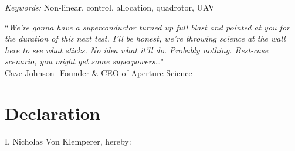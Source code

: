 \documentclass[a4paper, 11pt, oneside, openright, parskip=full]{book}
\newcommand{\auth}{Nicholas Von Klemperer}								%
\newcommand{\key}{Non-linear, control, allocation, quadrotor, UAV}					   %
\begin{document}
\begin{titlepage}
		\vskip 15mm	
	\begin{normalsize}				
		{\itshape Keywords:}
		\key			
	\end{normalsize}	
\end{titlepage}
\afterpage{\null\newpage}
\frontmatter
\begin{center}
\begin{minipage}{0.7\textwidth}
\centering
``\emph{We're gonna have a superconductor turned up full blast and pointed at you for the duration of this next test. I'll be honest, we're throwing science at the wall here to see what sticks. No idea what it'll do. Probably nothing. Best-case scenario, you might get some superpowers\ldots}"
\\
Cave Johnson -Founder \& CEO of Aperture Science
\end{minipage}
\end{center}
\chapter{Declaration}				
\label{ch:decl}
I, \auth,  hereby:
\end{document}
